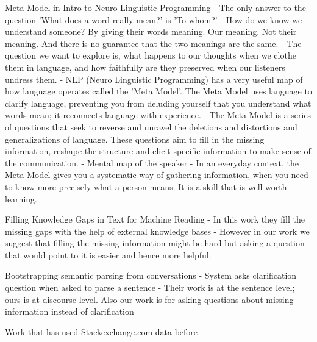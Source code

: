 \documentclass[11pt]{article}
\begin{document}
Meta Model in Intro to Neuro-Linguistic Programming
- The only answer to the question 'What does a word really mean?' is 'To whom?'
- How do we know we understand someone? By giving their words meaning. Our meaning. Not  their meaning. And there is no guarantee that the two meanings are the same.
- The question we want to explore is, what happens to our thoughts when we clothe them in language, and how faithfully are they preserved when our listeners undress them.
- NLP (Neuro Linguistic Programming) has a very useful map of how language operates called the 'Meta Model'. The Meta Model uses language to clarify language, preventing you from deluding yourself that you understand what words mean; it reconnects language with experience.
- The Meta Model is a series of questions that seek to reverse and unravel the deletions and distortions and generalizations of language. These questions aim to fill in the missing information, reshape the structure and elicit specific information to make sense of the communication.
- Mental map of the speaker
- In an everyday context, the Meta Model gives you a systematic way of gathering information, when you need to know more precisely what a person means. It is a skill that is well worth learning.

Filling Knowledge Gaps in Text for Machine Reading
- In this work they fill the missing gaps with the help of external knowledge bases
- However in our work we suggest that filling the missing information might be hard but asking a question that would point to it is easier and hence more helpful.

Bootstrapping semantic parsing from conversations
- System asks clarification question when asked to parse a sentence 
- Their work is at the sentence level; ours is at discourse level. Also our work is for asking questions about missing information instead of clarification

Work that has used Stackexchange.com data before




\fi


\end{document}
